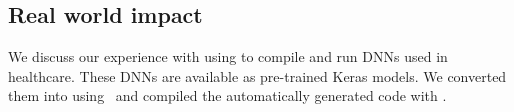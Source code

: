 
\begin{comment}
\begin{table}
  \centering
	\resizebox{0.7\columnwidth}{!}{

      \begin{tabular}{|l|c|c|c|l|}
    \hline
    Benchmark & Porthos (s) & Aramis (s) & Overhead \\
    \hline
	$\resnet$ & $25.87$ & $75.4$ & $2.9$x\\
	\hline
    $\densenet$ & $36.00$ & $112.9$ & $3.1$x \\ 	\hline
    $\squeezenet$ & $11.28$ & $29.01$ & $2.5$x \\ 	\hline
\end{tabular}
}
 \caption{Semi-honest Porthos vs Malicious Aramis.}
\label{tab:porthosport}
\end{table}
\end{comment}

%


\subsection{Real world impact}\label{subsec:realworldimpact}
We discuss our experience with using {\cryptflow} to compile and run DNNs used in healthcare. These DNNs are available as pre-trained Keras models. We converted them into \tensorflow using~\cite{kttf} and compiled the automatically generated \tensorflow code with \tool.

